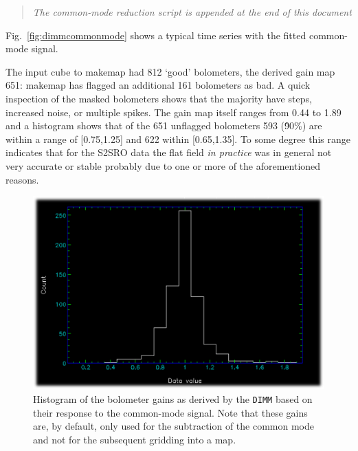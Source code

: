 \documentclass[twoside,11pt]{article}
\renewcommand{\_}{\texttt{\symbol{95}}}
\newenvironment{myquote}{\begin{quote}\begin{small}}{\end{small}\end{quote}}
\begin{document}
\begin{myquote}
{\sl The common-mode reduction script is appended at the end of this document}
\end{myquote}

Fig.~\ref{fig:dimmcommonmode} shows a typical time series with the
fitted common-mode signal.

The input cube to makemap had 812 `good' bolometers, the derived gain
map 651: makemap has flagged an additional 161 bolometers as bad.  A
quick inspection of the masked bolometers shows that the majority have
steps, increased noise, or multiple spikes.  The gain map itself
ranges from 0.44 to 1.89 and a histogram shows that of the 651
unflagged bolometers 593 (\~90\%) are within a range of [0.75,1.25] and
622 within [0.65,1.35]. To some degree this range indicates that for
the S2SRO data the flat field {\sl in practice} was in general not
very accurate or stable probably due to one or more of the
aforementioned reasons.

\begin{figure}
\begin{center}
\includegraphics[width=0.45\linewidth]{sc19_gain_histogram}
\caption{ Histogram of the bolometer gains as derived by the \texttt{DIMM}
based on their response to the common-mode signal. Note that these
gains are, by default, only used for the subtraction of the common
mode and not for the subsequent gridding into a map.}
\label{fig:gainhistogram}
\end{center}
\end{figure}
\end{document}
